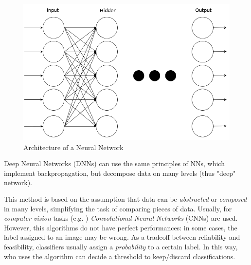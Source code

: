 \begin{figure}[htpb]
\centering
    \includegraphics[scale=0.28]{../img/nn}
    \caption{Architecture of a Neural Network}
    \label{fig:nn}
\end{figure}

Deep Neural Networks (DNNs) can use the same principles of NNs, which implement 
backpropagation, but decompose data on many levels (thus "deep" network).

This method is based on the assumption that data can be \textit{abstracted} or 
\textit{composed} in many levels, simplifying the task of comparing pieces of 
data.
Usually, for \textit{computer vision} tasks (e.g. \cite{Handwritten}) 
\textit{Convolutional Neural Networks} (CNNs) are used\cite{CNN}.
However, this algorithms do not have perfect performances: in some cases, the 
label assigned to an image may be wrong. As a tradeoff between reliability and 
feasibility, classifiers usually assign a \textit{probability} to a certain label. 
In this way, who uses the algorithm can decide a threshold to 
keep/discard classifications. 